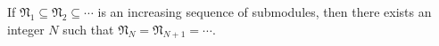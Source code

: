 If $\mathfrak{N}_1 \subseteq \mathfrak{N}_2 \subseteq \cdots$ is an increasing sequence of submodules, then there exists an integer $N$ such that $\mathfrak{N}_N = \mathfrak{N}_{N+1} = \cdots$.
